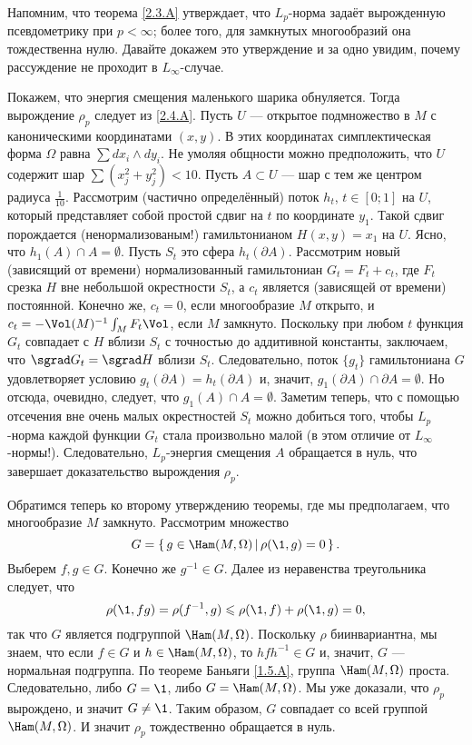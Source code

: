 Напомним, что теорема \ref{2.3.A} утверждает, что $L_p$-норма задаёт вырожденную псевдометрику при $p <\infty$;
более того, для замкнутых многообразий она тождественна нулю.
Давайте докажем это утверждение и за одно увидим, почему рассуждение не проходит в $L_\infty$-случае.

Покажем, что энергия смещения маленького шарика обнуляется.
Тогда вырождение $\rho_p$ следует из \ref{2.4.A}.
Пусть $U$ — открытое подмножество в $M$ с каноническими координатами $(x, y)$.
В этих координатах симплектическая форма $\Omega$ равна $\sum dx_i\wedge dy_i$.
Не умоляя общности можно предположить, что $U$ содержит шар $\sum(x^2_j + y_j^2) <10$.
Пусть $A \subset U$ — шар с тем же центром радиуса $\tfrac1{10}$.
Рассмотрим (частично определённый) поток $h_t$, $t \in [0; 1]$ на $U$, который представляет собой простой сдвиг на $t$ по координате $y_1$.
Такой сдвиг порождается (ненормализованым!) гамильтонианом $H (x, y) = x_1$ на $U$.
Ясно, что $h_1 (A) \cap A = \emptyset$.
Пусть $S_t$ это сфера $h_t (\partial A)$.
Рассмотрим новый (зависящий от времени) нормализованный гамильтониан
$G_t = F_t + c_t$, где $F_t$ срезка $H$ вне небольшой окрестности $S_t$, а $c_t$ является (зависящей от времени) постоянной.
Конечно же, $c_t = 0$, если многообразие $M$ открыто, и $c_t = -\Vol(M)^{-1}\int_M F_t \Vol$, если $M$ замкнуто.
Поскольку при любом $t$ функция $G_t$ совпадает с $H$ вблизи $S_t$ с точностью до аддитивной константы, заключаем, что $\sgrad G_t = \sgrad H$ вблизи $S_t$.
Следовательно, поток $\{g_t\}$ гамильтониана $G$ удовлетворяет условию $g_t (\partial A) = h_t (\partial A)$ и, значит, $g_1 (\partial A) \cap \partial A = \emptyset$.
Но отсюда, очевидно, следует, что $g_1 (A) \cap A = \emptyset$.
Заметим теперь, что с помощью отсечения вне очень малых окрестностей $S_t$ можно добиться того, чтобы $L_p$-норма каждой функции $G_t$ стала произвольно малой (в этом отличие от $L_\infty$-нормы!).
Следовательно, $L_p$-энергия смещения $A$ обращается в нуль, что завершает доказательство вырождения $\rho_p$.

Обратимся теперь ко второму утверждению теоремы, где мы предполагаем, что многообразие $M$ замкнуто.
Рассмотрим множество
\[G = \set{g \in \Ham (M, \Omega)}{\rho (\1, g) = 0}.\]
Выберем $f, g \in G$.
Конечно же $g^{-1} \in G$.
Далее из неравенства треугольника следует, что 
\[\rho (\1, f g) = \rho (f^{-1}, g) \le \rho (\1, f) + \rho (\1, g) = 0,\]
так что $G$ является подгруппой $\Ham (M, \Omega)$.
Поскольку $\rho$ биинвариантна, мы знаем, что если $f \in G$ и $h \in \Ham (M, \Omega)$, то $hf h^{-1} \in G$ и, значит, $G$ — нормальная подгруппа.
По теореме Баньяги \ref{1.5.A}, группа $\Ham (M, \Omega)$ проста.
Следовательно, либо $G = {\1}$, либо $G = \Ham (M, \Omega)$.
Мы уже доказали, что $\rho_p$ вырождено, и значит $G \ne {\1}$.
Таким образом, $G$ совпадает со всей группой $\Ham (M, \Omega)$.
И значит $\rho_p$ тождественно обращается в нуль.
\qeds

